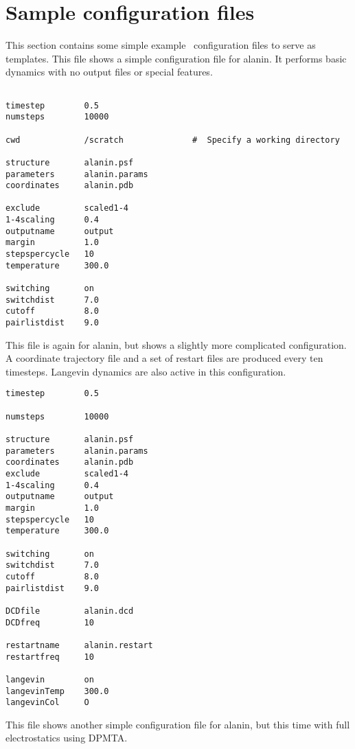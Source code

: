 \section{Sample configuration files}
\label{section:sample}
This section contains some simple example \NAMD\ configuration files to serve
as templates.
\prettypar
This file shows a simple configuration file for alanin.  
It performs basic dynamics
with no output files or special features.

\begin{verbatim}

timestep        0.5
numsteps        10000

cwd             /scratch              #  Specify a working directory 

structure       alanin.psf
parameters      alanin.params
coordinates     alanin.pdb

exclude         scaled1-4
1-4scaling      0.4
outputname      output
margin          1.0
stepspercycle   10
temperature     300.0

switching       on
switchdist      7.0
cutoff          8.0
pairlistdist    9.0

\end{verbatim}

\newpage
This file is again for alanin, 
but shows a slightly more complicated configuration.  
A coordinate trajectory file and a set of restart files 
are produced every ten timesteps.  
Langevin dynamics are also active in this configuration.  

\begin{verbatim}
timestep        0.5

numsteps        10000

structure       alanin.psf
parameters      alanin.params
coordinates     alanin.pdb
exclude         scaled1-4
1-4scaling      0.4
outputname      output
margin          1.0
stepspercycle   10
temperature     300.0

switching       on
switchdist      7.0
cutoff          8.0
pairlistdist    9.0

DCDfile         alanin.dcd
DCDfreq         10

restartname     alanin.restart
restartfreq     10

langevin        on
langevinTemp    300.0
langevinCol     O
\end{verbatim}

\newpage
This file shows another simple configuration file for alanin, 
but this time with full electrostatics using DPMTA.  

